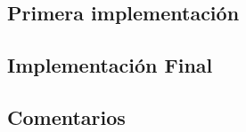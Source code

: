 \documentclass{report}
\begin{document}
        \subsection*{Primera implementación}
          \paragraph*{}{

          }
        \subsection*{Implementación Final}
          \paragraph*{}{

          }
        \subsection*{Comentarios}
          \paragraph*{}{

          }
\end{document}
